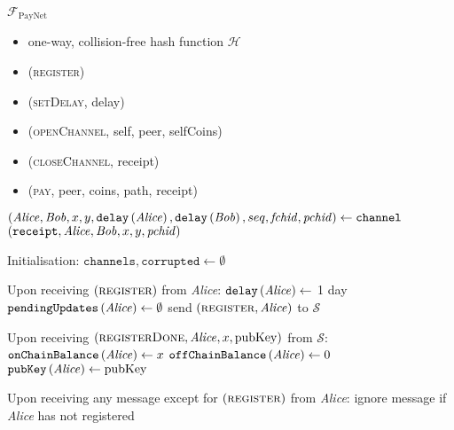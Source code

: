 \begin{functionality}{$\mathcal{F}_{\mathrm{PayNet}}$}
  \label{alg:payfunc}
    \begin{itemize}
      \item one-way, collision-free hash function $\mathcal{H}$
    \end{itemize}

    \begin{itemize}
      \item (\textsc{register})
      \item (\textsc{setDelay}, delay)
      \item (\textsc{openChannel}, self, peer, selfCoins)
      \item (\textsc{closeChannel}, receipt)
      \item (\textsc{pay}, peer, coins, path, receipt)
    \end{itemize}

  \begin{algorithmic}[1]
      \State $\left(\mathit{Alice}, \mathit{Bob}, x, y, \mathtt{delay}\left(\mathit{Alice}\right),
      \mathtt{delay}\left(\mathit{Bob}\right), seq, \mathit{fchid},
      \mathit{pchid}\right) \gets \mathtt{channel}$
      \State \Return $\left(\mathtt{receipt}, \mathit{Alice}, \mathit{Bob}, x, y,
      \mathit{pchid}\right)$
    \EndFunction
    \State

    \State Initialisation:
    \Indent
      \State $\mathtt{channels}, \mathtt{corrupted} \gets \emptyset$
    \EndIndent
    \State

    \State Upon receiving $\left(\textsc{register}\right)$ from \textit{Alice}:
    \Indent
      \State $\mathtt{delay}\left(\mathit{Alice}\right) \gets$ 1 day 
      \State $\mathtt{pendingUpdates}\left(\mathit{Alice}\right) \gets \emptyset$
      \State send $\left(\textsc{register}, \mathit{Alice}\right)$ to $\mathcal{S}$
    \EndIndent
    \State

    \State Upon receiving $\left(\textsc{registerDone}, \mathit{Alice}, x,
    \mathrm{pubKey}\right)$ from $\mathcal{S}$: 
    \Indent
      \State $\mathtt{onChainBalance}\left(\mathit{Alice}\right) \gets x$
      \State $\mathtt{offChainBalance}\left(\mathit{Alice}\right) \gets 0$
      \State $\mathtt{pubKey}\left(\mathit{Alice}\right) \gets \mathrm{pubKey}$
    \EndIndent
    \State

    \State Upon receiving any message except for
    $\left(\textsc{register}\right)$ from \textit{Alice}:
    \Indent
      \State ignore message if \textit{Alice} has not registered
    \EndIndent
    \State


\end{algorithmic}
\end{functionality}
